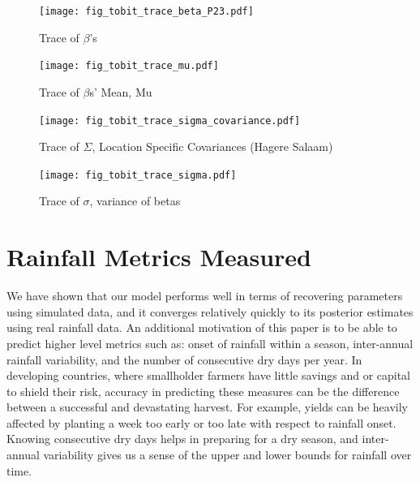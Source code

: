 \documentclass[12pt]{article}
\begin{document}
\begin{figure}[htbp]
\caption{Trace of $\beta$'s}
\begin{center}
\texttt{[image: fig\_tobit\_trace\_beta\_P23.pdf]}
\end{center}
\end{figure}

\begin{figure}[htbp]
\caption{Trace of $\beta$s' Mean, Mu}
\begin{center}
\texttt{[image: fig\_tobit\_trace\_mu.pdf]}
\end{center}
\end{figure}


\begin{figure}[htbp]
\caption{Trace of $\Sigma$, Location Specific Covariances (Hagere Salaam) }
\begin{center}
\texttt{[image: fig\_tobit\_trace\_sigma\_covariance.pdf]}     
\end{center}
\end{figure}

\begin{figure}[htbp]
\caption{Trace of $\sigma$, variance of betas}
\begin{center}
\texttt{[image: fig\_tobit\_trace\_sigma.pdf]}
\end{center}
\end{figure}




\section{Rainfall Metrics Measured}
\label{sec:metrics}

We have shown that our model performs well in terms of recovering parameters using simulated data, and it converges relatively quickly to its posterior estimates using real rainfall data. An additional motivation of this paper is to be able to predict higher level metrics such as: onset of rainfall within a season, inter-annual rainfall variability, and the number of consecutive dry days per year. In developing countries, where smallholder farmers have little savings and or capital to shield their risk, accuracy in predicting these measures can be the difference between a successful and devastating harvest. For example, yields can be heavily affected by planting a week too early or too late with respect to rainfall onset. Knowing consecutive dry days helps in preparing for a dry season, and inter-annual variability gives us a sense of the upper and lower bounds for rainfall over time. 
\end{document}
